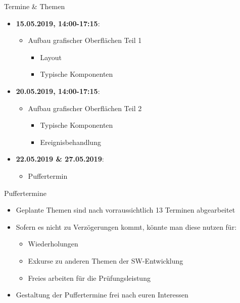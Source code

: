 \begin{frame}{Termine \& Themen}
	\begin{itemize}
		\item \textbf{15.05.2019, 14:00-17:15}:
		\begin{itemize}
			\item Aufbau grafischer Oberflächen Teil 1
			\begin{itemize}
				\item Layout
				\item Typische Komponenten
			\end{itemize}
		\end{itemize}
		\item \textbf{20.05.2019, 14:00-17:15}:
		\begin{itemize}
			\item Aufbau grafischer Oberflächen Teil 2
			\begin{itemize}
				\item Typische Komponenten
				\item Ereignisbehandlung
			\end{itemize}
		\end{itemize}
		\item \textbf{22.05.2019 \& 27.05.2019}:
		\begin{itemize}
			\item Puffertermin
		\end{itemize}
	\end{itemize}
\end{frame}

\begin{frame}{Puffertermine}{}
	\begin{itemize}
		\item Geplante Themen sind nach vorraussichtlich 13 Terminen abgearbeitet
		\item Sofern es nicht zu Verzögerungen kommt, könnte man diese nutzen für:
		\begin{itemize}
			\item Wiederholungen
			\item Exkurse zu anderen Themen der SW-Entwicklung
			\item Freies arbeiten für die Prüfungsleistung
		\end{itemize}
		\item Gestaltung der Puffertermine frei nach euren Interessen
	\end{itemize}
\end{frame}

